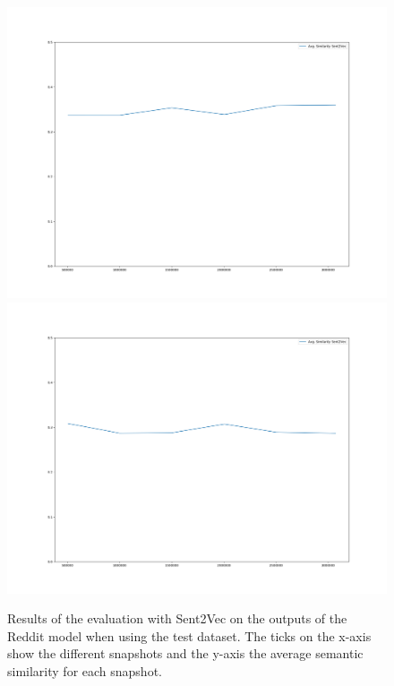 \begin{figure}[H]
	\includegraphics[width=\linewidth]{img/plots/reddit/s2v_wiki_cosine_similarity.png}
	\centering
	\small
	\endminipage\hfill
	\includegraphics[width=\linewidth]{img/plots/reddit/s2v_twitter_cosine_similarity.png}
	\centering
	\small
	\endminipage\hfill
	\caption{Results of the evaluation with Sent2Vec on the outputs of the Reddit model when using the test dataset. The ticks on the x-axis show the different snapshots and the y-axis the average semantic similarity for each snapshot.}
	\label{results:sent2vec:reddit:results}
\end{figure}
